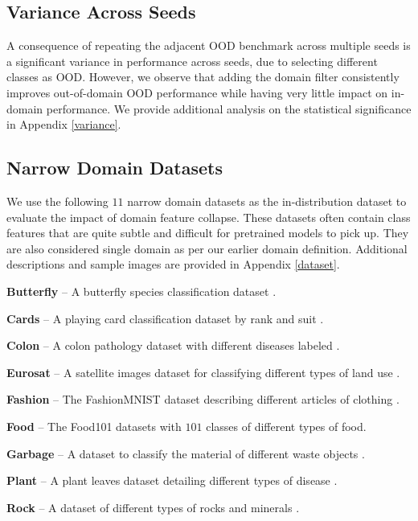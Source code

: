 \documentclass[letterpaper]{article} %
\theoremstyle{plain}
\theoremstyle{definition}
\theoremstyle{remark}
\begin{document}
\subsection{Variance Across Seeds}

A consequence of repeating the adjacent OOD benchmark across multiple seeds is a significant variance in performance across seeds, due to selecting different classes as OOD. However, we observe that adding the domain filter consistently improves out-of-domain OOD performance while having very little impact on in-domain performance. We provide additional analysis on the statistical significance in Appendix \ref{variance}.

\subsection{Narrow Domain Datasets}

We use the following $11$ narrow domain datasets as the in-distribution dataset to evaluate the impact of domain feature collapse. These datasets often contain class features that are quite subtle and difficult for pretrained models to pick up. They are also considered single domain as per our earlier domain definition. Additional descriptions and sample images are provided in Appendix \ref{dataset}.

\textbf{Butterfly} – A butterfly species classification dataset \citep{AIPlanet_DataSprint107_2024}.

\textbf{Cards} – A playing card classification dataset by rank and suit \citep{card_data}.

\textbf{Colon} – A colon pathology dataset with different diseases labeled \citep{yang2023medmnist}.

\textbf{Eurosat} – A satellite images dataset for classifying different types of land use \citep{helber2019eurosat}.

\textbf{Fashion} – The FashionMNIST dataset describing different articles of clothing \citep{fashion}.

\textbf{Food} – The Food101 datasets \citep{food} with $101$ classes of different types of food.

\textbf{Garbage} – A dataset to classify the material of different waste objects \citep{single2023realwaste}.

\textbf{Plant} – A plant leaves dataset detailing different types of disease \citep{plant}.

\textbf{Rock} – A dataset of different types of rocks and minerals \citep{rock_data}.
\end{document}
